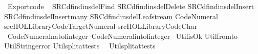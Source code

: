 %
\begin{isabellebody}%
%
%
\isadelimtheory
%
\endisadelimtheory
%
\isatagtheory
{}\isamarkupfalse%
\ Export{\isacharunderscore}code\isanewline
{}\ \isanewline
{\isachardoublequoteopen}{\isachardollar}SRC{\isacharslash}d{\isacharunderscore}find{\isacharunderscore}ins{\isacharunderscore}del{\isacharslash}Find{\isachardoublequoteclose}\isanewline
{\isachardoublequoteopen}{\isachardollar}SRC{\isacharslash}d{\isacharunderscore}find{\isacharunderscore}ins{\isacharunderscore}del{\isacharslash}Delete{}{\isachardoublequoteclose}\isanewline
{\isachardoublequoteopen}{\isachardollar}SRC{\isacharslash}d{\isacharunderscore}find{\isacharunderscore}ins{\isacharunderscore}del{\isacharslash}Insert{\isachardoublequoteclose}\isanewline
{\isachardoublequoteopen}{\isachardollar}SRC{\isacharslash}d{\isacharunderscore}find{\isacharunderscore}ins{\isacharunderscore}del{\isacharslash}Insert{\isacharunderscore}many{\isachardoublequoteclose}\isanewline
{\isachardoublequoteopen}{\isachardollar}SRC{\isacharslash}d{\isacharunderscore}find{\isacharunderscore}ins{\isacharunderscore}del{\isacharslash}Leaf{\isacharunderscore}stream{\isachardoublequoteclose}\isanewline
Code{\isacharunderscore}Numeral\ \isanewline
{\isachardoublequoteopen}{\isachartilde}{\isachartilde}{\isacharslash}src{\isacharslash}HOL{\isacharslash}Library{\isacharslash}Code{\isacharunderscore}Target{\isacharunderscore}Numeral{\isachardoublequoteclose}\isanewline
{\isachardoublequoteopen}{\isachartilde}{\isachartilde}{\isacharslash}src{\isacharslash}HOL{\isacharslash}Library{\isacharslash}Code{\isacharunderscore}Char{\isachardoublequoteclose}\isanewline
{}%
\endisatagtheory
{\isafoldtheory}%
%
\isadelimtheory
\isanewline
%
\endisadelimtheory
\isanewline
\isanewline
{}\isamarkupfalse%
\ {\isachardoublequoteopen}Code{\isacharunderscore}Numeral{\isachardot}nat{\isacharunderscore}of{\isacharunderscore}integer{\isachardoublequoteclose}\ {\isachardoublequoteopen}Code{\isacharunderscore}Numeral{\isachardot}int{\isacharunderscore}of{\isacharunderscore}integer{\isachardoublequoteclose}\ \isanewline
\isanewline
Util{\isachardot}is{\isacharunderscore}Ok\isanewline
Util{\isachardot}from{\isacharunderscore}to\isanewline
Util{\isachardot}String{\isacharunderscore}error\isanewline
Util{\isachardot}split{\isacharunderscore}at{\isacharunderscore}tests\ \ \isanewline
Util{\isachardot}split{\isacharunderscore}at{\isacharunderscore}{}{\isacharunderscore}tests\isanewline

\end{isabellebody}
